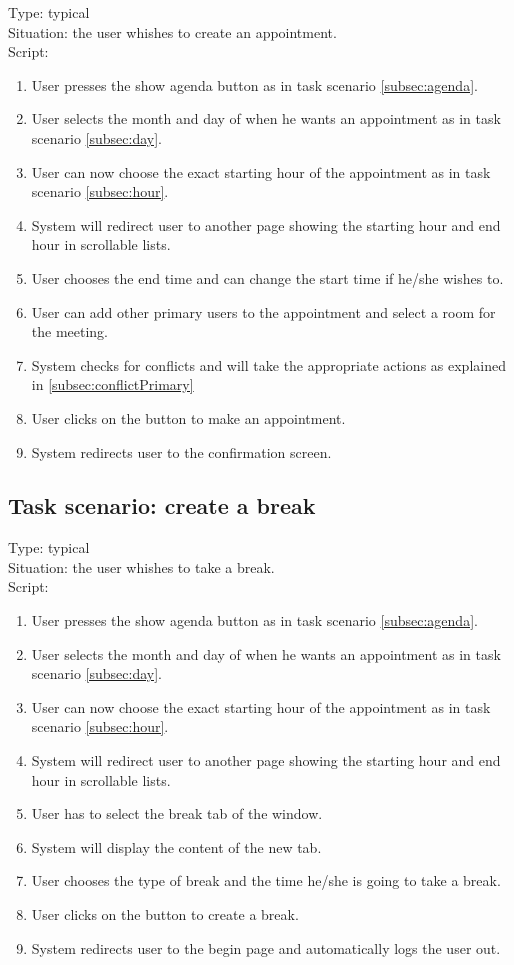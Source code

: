 \documentclass[11pt, a4paper,svglistings]{report}
\begin{document}
Type: typical \\
Situation: the user whishes to create an appointment. \\
Script:
\begin{enumerate}
\item User presses the show agenda button as in task scenario \ref{subsec:agenda}.
\item User selects the month and day of when he wants an appointment as in task scenario \ref{subsec:day}.
\item User can now choose the exact starting hour of the appointment as in task scenario \ref{subsec:hour}.
\item System will redirect user to another page showing the starting hour and end hour in scrollable lists.
\item User chooses the end time and can change the start time if he/she wishes to.
\item User can add other primary users to the appointment and select a room for the meeting.
\item System checks for conflicts and will take the appropriate actions as explained in \ref{subsec:conflictPrimary}
\item User clicks on the button to make an appointment.
\item System redirects user to the confirmation screen.
\end{enumerate}


\subsection{Task scenario: create a break}


Type: typical \\
Situation: the user whishes to take a break. \\
Script:
\begin{enumerate}
\item User presses the show agenda button as in task scenario \ref{subsec:agenda}.
\item User selects the month and day of when he wants an appointment as in task scenario \ref{subsec:day}.
\item User can now choose the exact starting hour of the appointment as in task scenario \ref{subsec:hour}.
\item System will redirect user to another page showing the starting hour and end hour in scrollable lists.
\item User has to select the break tab of the window.
\item System will display the content of the new tab.
\item User chooses the type of break and the time he/she is going to take a break.
\item User clicks on the button to create a break.
\item System redirects user to the begin page and automatically logs the user out.
\end{enumerate}
\end{document}
